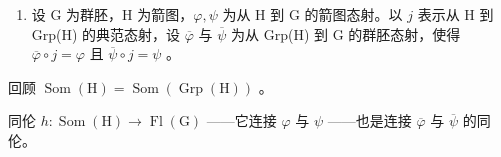 \begin{enumerate}
\def\labelenumi{\arabic{enumi})}
\setcounter{enumi}{1}
\tightlist
\item
  设 G 为群胚，H 为箭图，\(\varphi, \psi\) 为从 H 到 G 的箭图态射。以 \(j\) 表示从 H 到 Grp(H) 的典范态射，设 \(\overline{\varphi}\) 与 \(\overline{\psi}\) 为从 Grp(H) 到 G 的群胚态射，使得 \(\overline{\varphi} \circ j = \varphi\) 且 \(\overline{\psi} \circ j = \psi\) 。
\end{enumerate}

回顾 \(\operatorname{Som}(\mathrm{H}) = \operatorname{Som}(\operatorname{Grp}(\mathrm{H}))\) 。

同伦 \(h\colon \operatorname{Som}(\mathrm{H})\to \operatorname{Fl}(\mathrm{G})\) ——它连接 \(\varphi\) 与 \(\psi\) ——也是连接 \(\overline{\varphi}\) 与 \(\overline{\psi}\) 的同伦。

